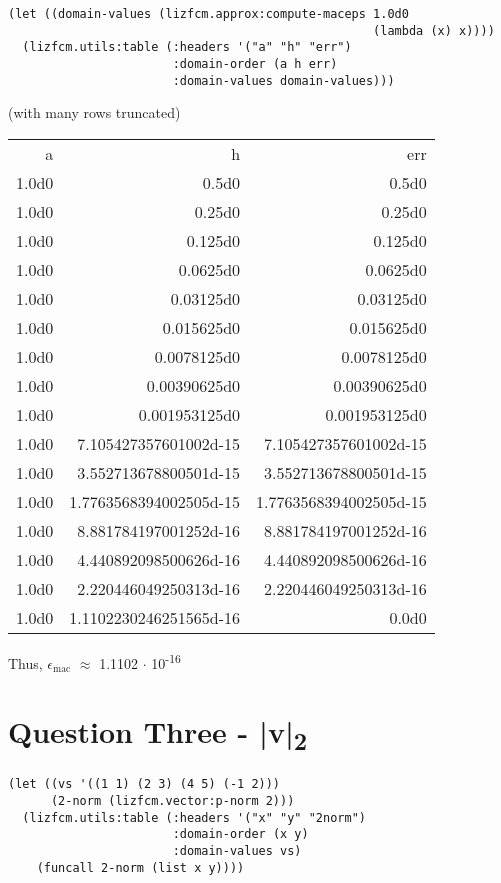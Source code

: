 \documentclass[11pt]{article}
\begin{document}
\begin{verbatim}
(let ((domain-values (lizfcm.approx:compute-maceps 1.0d0
                                                   (lambda (x) x))))
  (lizfcm.utils:table (:headers '("a" "h" "err")
                       :domain-order (a h err)
                       :domain-values domain-values)))
\end{verbatim}

(with many rows truncated)
\begin{center}
\begin{tabular}{rrr}
a & h & err\\[0pt]
1.0d0 & 0.5d0 & 0.5d0\\[0pt]
1.0d0 & 0.25d0 & 0.25d0\\[0pt]
1.0d0 & 0.125d0 & 0.125d0\\[0pt]
1.0d0 & 0.0625d0 & 0.0625d0\\[0pt]
1.0d0 & 0.03125d0 & 0.03125d0\\[0pt]
1.0d0 & 0.015625d0 & 0.015625d0\\[0pt]
1.0d0 & 0.0078125d0 & 0.0078125d0\\[0pt]
1.0d0 & 0.00390625d0 & 0.00390625d0\\[0pt]
1.0d0 & 0.001953125d0 & 0.001953125d0\\[0pt]
1.0d0 & 7.105427357601002d-15 & 7.105427357601002d-15\\[0pt]
1.0d0 & 3.552713678800501d-15 & 3.552713678800501d-15\\[0pt]
1.0d0 & 1.7763568394002505d-15 & 1.7763568394002505d-15\\[0pt]
1.0d0 & 8.881784197001252d-16 & 8.881784197001252d-16\\[0pt]
1.0d0 & 4.440892098500626d-16 & 4.440892098500626d-16\\[0pt]
1.0d0 & 2.220446049250313d-16 & 2.220446049250313d-16\\[0pt]
1.0d0 & 1.1102230246251565d-16 & 0.0d0\\[0pt]
\end{tabular}
\end{center}

Thus, \(\epsilon_{\text{mac}}\) \(\approx\) 1.1102 \(\cdot\) 10\textsuperscript{-16}

\section{Question Three - |v|\textsubscript{2}}
\label{sec:org04608d9}
\begin{verbatim}
(let ((vs '((1 1) (2 3) (4 5) (-1 2)))
      (2-norm (lizfcm.vector:p-norm 2)))
  (lizfcm.utils:table (:headers '("x" "y" "2norm")
                       :domain-order (x y)
                       :domain-values vs)
    (funcall 2-norm (list x y))))
\end{verbatim}
\end{document}
